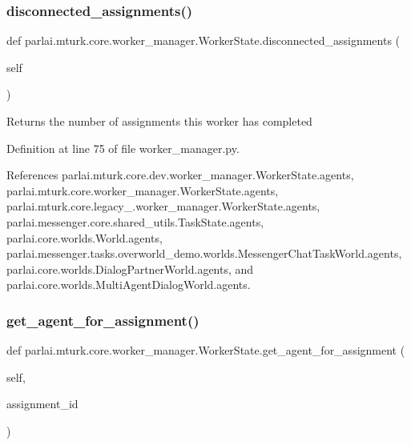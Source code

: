 \subsubsection{\texorpdfstring{disconnected\+\_\+assignments()}{disconnected\_assignments()}}
{\footnotesize\ttfamily def parlai.\+mturk.\+core.\+worker\+\_\+manager.\+Worker\+State.\+disconnected\+\_\+assignments (\begin{DoxyParamCaption}\item[{}]{self }\end{DoxyParamCaption})}

\begin{DoxyVerb}Returns the number of assignments this worker has completed\end{DoxyVerb}
 

Definition at line 75 of file worker\+\_\+manager.\+py.



References parlai.\+mturk.\+core.\+dev.\+worker\+\_\+manager.\+Worker\+State.\+agents, parlai.\+mturk.\+core.\+worker\+\_\+manager.\+Worker\+State.\+agents, parlai.\+mturk.\+core.\+legacy\+\_.\+worker\+\_\+manager.\+Worker\+State.\+agents, parlai.\+messenger.\+core.\+shared\+\_\+utils.\+Task\+State.\+agents, parlai.\+core.\+worlds.\+World.\+agents, parlai.\+messenger.\+tasks.\+overworld\+\_\+demo.\+worlds.\+Messenger\+Chat\+Task\+World.\+agents, parlai.\+core.\+worlds.\+Dialog\+Partner\+World.\+agents, and parlai.\+core.\+worlds.\+Multi\+Agent\+Dialog\+World.\+agents.

\mbox{\label{classparlai_1_1mturk_1_1core_1_1worker__manager_1_1WorkerState_ab258d81b68825e049f236cbb8352a126}} 
\subsubsection{\texorpdfstring{get\+\_\+agent\+\_\+for\+\_\+assignment()}{get\_agent\_for\_assignment()}}
{\footnotesize\ttfamily def parlai.\+mturk.\+core.\+worker\+\_\+manager.\+Worker\+State.\+get\+\_\+agent\+\_\+for\+\_\+assignment (\begin{DoxyParamCaption}\item[{}]{self,  }\item[{}]{assignment\+\_\+id }\end{DoxyParamCaption})}



